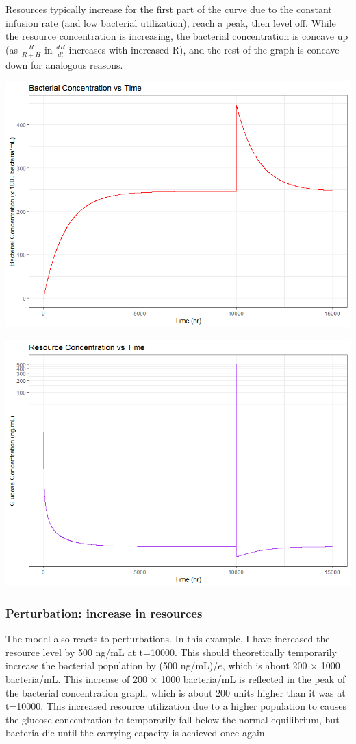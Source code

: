 \documentclass{article}
\begin{document}
Resources typically increase for the first part of the curve due to the constant infusion rate (and low bacterial utilization), reach a peak, then level off. While the resource concentration is increasing, the bacterial concentration is concave up (as $\frac{R}{R+H}$ in $\frac{dR}{dt}$ increases with increased R), and the rest of the graph is concave down for analogous reasons. 

\begin{center}
\includegraphics[scale=0.5]{plots/NoPhage_U_perturbed.png}

\includegraphics[scale=0.5]{plots/NoPhage_R_perturbed.png}
\end{center}

\subsubsection{Perturbation: increase in resources}
The model also reacts to perturbations. In this example, I have increased the resource level by 500 ng/mL at t=10000. This should theoretically temporarily increase the bacterial population by (500 ng/mL)/$e$, which is about 200 $\times$ 1000 bacteria/mL. This increase of 200 $\times$ 1000 bacteria/mL is reflected in the peak of the bacterial concentration graph, which is about 200 units higher than it was at t=10000. This increased resource utilization due to a higher population to causes the glucose concentration to temporarily fall below the normal equilibrium, but bacteria die until the carrying capacity is achieved once again. 
\end{document}
